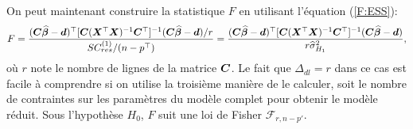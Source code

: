 On peut maintenant construire la statistique $F$ en utilisant l'équation (\ref{F:ESS}):
\begin{equation*}\label{F:lingen}
F={(\bm{C}\widehat{\bm\beta}-\bm{d})^\top[\bm{C}(\bm{X}^\top\bm{X})^{-1}\bm{C}^\top]^{-1}(\bm{C}\widehat{\bm\beta}-\bm{d})/r\over
SC^{(1)}_{res}/(n-p^\top)}={
(\bm{C}\widehat{\bm\beta}-\bm{d})^\top[\bm{C}(\bm{X}^\top\bm{X})^{-1}\bm{C}^\top]^{-1}(\bm{C}\widehat{\bm\beta}-\bm{d})\over
r\widehat\sigma^2_{H_1}},
\end{equation*}
où $r$ note le nombre de lignes de la matrice $\bm{C}$.
Le fait que $\Delta_{dl}=r$ dans ce cas est facile \`a comprendre si on utilise la troisième manière de le calculer, soit le nombre de contraintes sur les param\`etres du mod\`ele complet pour
obtenir le mod\`ele réduit. Sous l'hypothèse $H_0$, $F$ suit une loi de Fisher $\mathcal{F}_{r,n-p'}.$
